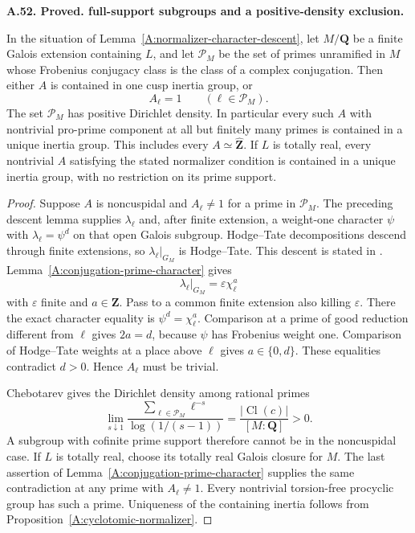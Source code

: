 \documentclass[11pt,oneside]{article}
\makeatletter
\newcounter{statementanchor}
\newenvironment{statement}[3]{%
 \refstepcounter{statementanchor}\def\@currentlabel{#1}%
 \par\addvspace{9pt}\noindent
 \textbf{#1. #2. #3.}\par\nobreak\noindent\ignorespaces
}{\par\addvspace{5pt}}
\makeatother
\begin{document}
\begin{statement}{A.52}{Proved}{full-support subgroups and a positive-density exclusion}
\label{st:A.52}
\label{A:full-support-normalizer}
In the situation of Lemma~\ref{A:normalizer-character-descent},
let $M/\mathbf Q$ be a finite Galois extension
containing $L$, and let $\mathcal P_M$ be the set of
primes unramified in $M$ whose Frobenius conjugacy
class is the class of a complex conjugation.
Then either $A$ is contained in one cusp inertia
group, or
\[
                       A_\ell=1
                     \qquad(\ell\in\mathcal P_M).
\]
The set $\mathcal P_M$ has positive Dirichlet density.
In particular every such $A$ with nontrivial
pro-prime component at all but finitely many primes
is contained in a unique inertia group. This includes
every $A\simeq\widehat{\mathbf Z}$. If $L$ is totally
real, every nontrivial $A$ satisfying the stated
normalizer condition is contained in a unique
inertia group, with no restriction on its prime
support.
\end{statement}
\begin{proof}
Suppose $A$ is noncuspidal and $A_\ell\ne1$ for a
prime in $\mathcal P_M$. The preceding descent
lemma supplies $\lambda_\ell$ and, after finite
extension, a weight-one character $\psi$ with
$\lambda_\ell=\psi^d$ on that open Galois subgroup.
Hodge--Tate decompositions descend through finite
extensions, so $\lambda_\ell|_{G_M}$ is Hodge--Tate.
This descent is stated in
\cite[Chapter III, Appendix, Corollary 2 on
p.~III--32]{A_SerreAbelian}.
Lemma~\ref{A:conjugation-prime-character} gives
\[
              \lambda_\ell|_{G_M}
                         =\varepsilon\chi_\ell^a
\]
with $\varepsilon$ finite and $a\in\mathbf Z$.
Pass to a common finite extension also killing
$\varepsilon$. There the exact character equality is
$\psi^d=\chi_\ell^a$. Comparison at a prime of good
reduction different from $\ell$ gives $2a=d$,
because $\psi$ has Frobenius weight one. Comparison
of Hodge--Tate weights at a place above $\ell$
gives $a\in\{0,d\}$. These equalities contradict
$d>0$. Hence $A_\ell$ must be trivial.

Chebotarev gives the Dirichlet density among
rational primes
\[
 \lim_{s\downarrow1}
 \frac{\sum_{\ell\in\mathcal P_M}\ell^{-s}}
      {\log(1/(s-1))}
          =\frac{|\operatorname{Cl}(c)|}{[M:\mathbf Q]}>0.
\]
A subgroup with cofinite prime
support therefore cannot be in the noncuspidal
case. If $L$ is totally real, choose its totally
real Galois closure for $M$. The last assertion of
Lemma~\ref{A:conjugation-prime-character} supplies
the same contradiction at any prime with
$A_\ell\ne1$. Every nontrivial torsion-free procyclic
group has such a prime. Uniqueness of the containing
inertia follows from
Proposition~\ref{A:cyclotomic-normalizer}.
\end{proof}
\end{document}
